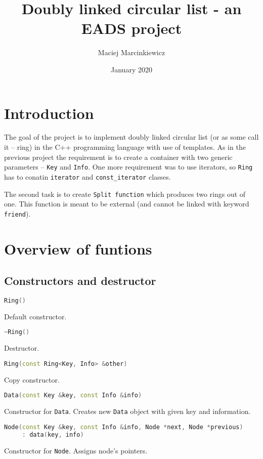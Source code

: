 \documentclass{article}
\title{Doubly linked circular list - an EADS project}
\author{Maciej Marcinkiewicz}
\date{January 2020}
\begin{document}
\maketitle

\section{Introduction}

The goal of the project is to implement doubly linked circular list (or as some call
it – ring) in the C++ programming language with use of templates. As in the previous 
project the requirement is to create a container with two generic parameters – {\tt Key}
and {\tt Info}. One more requirement was to use iterators, so {\tt Ring} has to conatin
{\tt iterator} and {\tt const\_iterator} classes.

\indent
The second task is to create {\tt Split function} which produces two rings out of one.
This function is meant to be external (and cannot be linked with keyword {\tt friend}).

\section{Overview of funtions}

\subsection{Constructors and destructor}

\begin{lstlisting}[language=C++]
Ring()
\end{lstlisting}
Default constructor.

\begin{lstlisting}[language=C++]
~Ring()
\end{lstlisting}
Destructor.

\begin{lstlisting}[language=C++]
Ring(const Ring<Key, Info> &other)
\end{lstlisting}
Copy constructor.

\begin{lstlisting}[language=C++]
Data(const Key &key, const Info &info)
\end{lstlisting}
Constructor for {\tt Data}. Creates new {\tt Data} object with given key and information.

\begin{lstlisting}[language=C++]
Node(const Key &key, const Info &info, Node *next, Node *previous)
     : data(key, info)
\end{lstlisting}
Constructor for {\tt Node}. Assigns node's pointers.
\end{document}
